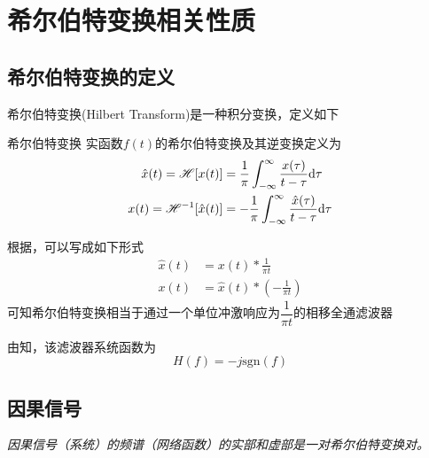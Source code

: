 \section{希尔伯特变换相关性质}\label{appendix:II}
\subsection{希尔伯特变换的定义}
    希尔伯特变换(Hilbert Transform)是一种积分变换，定义如下
    \begin{mydef}{希尔伯特变换}\label{def:Hilbert}
        实函数$f(t)$的希尔伯特变换及其逆变换定义为
        \begin{equation}
            \begin{split}
                \hat{x}(t)=\mathscr{H}[x(t)]&=\frac{1}{\pi}\int_{-\infty}^{\infty}\frac{x(\tau)}{t-\tau}\text{\upshape d} \tau\\
                x(t)=\mathscr{H}^{-1}[\hat{x}(t)]&=-\frac{1}{\pi}\int_{-\infty}^{\infty}\frac{\hat{x}(\tau)}{t-\tau}\text{\upshape d} \tau
            \end{split}
        \end{equation}
    \end{mydef}
    根据，可以写成如下形式
    \begin{equation}
        \begin{split}
            \hat{x}(t)&=x(t)*\frac{1}{\pi t}\\
            x(t)&=\hat{x}(t)*\left(-\frac{1}{\pi t}\right)
        \end{split}
    \end{equation}
    可知希尔伯特变换相当于通过一个单位冲激响应为$\dfrac{1}{\pi t}$的相移全通滤波器

    由知，该滤波器系统函数为
    \begin{equation}
        H(f)=-j\text{sgn}(f)
    \end{equation}

\subsection{因果信号}
    \emph{因果信号（系统）的频谱（网络函数）的实部和虚部是一对希尔伯特变换对。}


